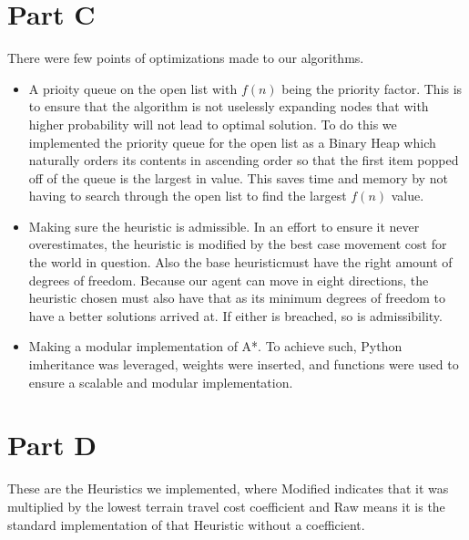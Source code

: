 \documentclass[12pt]{article}
\begin{document}
\section{Part C}
There were few points of optimizations made to our algorithms.
\begin{itemize}
  \item A prioity queue on the open list with \(f(n)\) being the priority factor. This is to ensure that the algorithm is not uselessly expanding nodes that with higher probability will not lead to optimal solution. To do this we implemented the priority queue for the open list as a Binary Heap which naturally orders its contents in ascending order so that the first item popped off of the queue is the largest in value. This saves time and memory by not having to search through the open list to find the largest \(f(n)\) value.
  \item Making sure the heuristic is admissible. In an effort to ensure it never overestimates, the heuristic is modified by the best case movement cost for the world in question. Also the base heuristicmust have the right amount of degrees of freedom. Because our agent can move in eight directions, the heuristic chosen must also have that as its minimum degrees of freedom to have a better solutions arrived at. If either is breached, so is admissibility.
  \item Making a modular implementation of A*. To achieve such, Python imheritance was leveraged, weights were inserted, and functions were used to ensure a scalable and modular implementation.
\end{itemize}

\section{Part D}
These are the Heuristics we implemented, where Modified indicates that it was multiplied by the lowest terrain travel cost coefficient and Raw means it is the standard implementation of that Heuristic without a coefficient.
\end{document}
